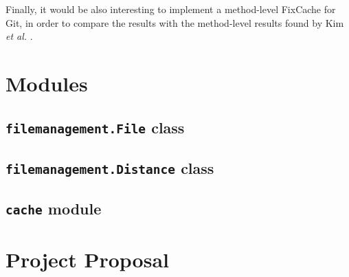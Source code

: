\documentclass[12pt,twoside,notitlepage]{report}
\newcommand{\fxch}{FixCache}
\newcommand{\etal}{\textit{et al.}}
\begin{document}
Finally, it would be also interesting to implement a method-level \fxch{} for Git, in order to compare the results with the method-level results found by Kim \etal{} \cite{FixCache}.


\cleardoublepage
\appendix
\chapter{Modules}

\section{\texttt{filemanagement.File} class}

\clearpage
\section{\texttt{filemanagement.Distance} class}

\clearpage
\section{\texttt{cache} module}

\chapter{Project Proposal}

\end{document}
